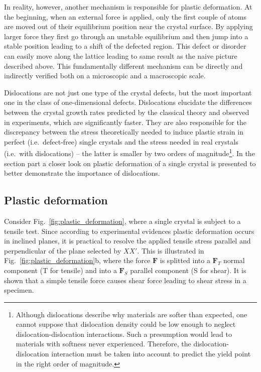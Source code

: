 In reality, however, another mechanism is responsible for plastic deformation. At the beginning, when an external force is applied, only the first couple of atoms are moved out of their equilibrium position near the crystal surface. By applying larger force they first go through an unstable equilibrium and then jump into a stable position leading to a shift of the defected region. This defect or disorder can easily move along the lattice leading to same result as the naive picture described above. This fundamentally different mechanism can be directly and indirectly verified both on a microscopic and a macroscopic scale.

Dislocations are not just one type of the crystal defects, but the most important one in the class of one-dimensional defects. Dislocations elucidate the differences between the crystal growth rates predicted by the classical theory and observed in experiments, which are significantly faster. They are also responsible for the discrepancy between the stress theoretically needed to induce plastic strain in perfect (i.e.\ defect-free) single crystals and the stress needed in real crystals (i.e.\ with dislocations) -- the latter is smaller by two orders of magnitude\footnote{Although dislocations describe why materials are softer than expected, one cannot suppose that dislocation density could be low enough to neglect dislocation-dislocation interactions. Such a presumption would lead to materials with softness never experienced. Therefore, the dislocation-dislocation interaction must be taken into account to predict the yield point in the right order of magnitude.}. In the section part a closer look on plastic deformation of a single crystal is presented to better demonstrate the importance of dislocations.

\subsection{Plastic deformation}

Consider Fig.~\ref{fig:plastic_deformation}, where a single crystal is subject to a tensile test. Since according to experimental evidences plastic deformation occurs in inclined planes, it is practical to resolve the applied tensile stress parallel and perpendicular of the plane selected by $XX'$. This is illustrated in Fig.~\ref{fig:plastic_deformation}b, where the force ${\mathbf{F}}$ is splitted into a ${{\mathbf{F}}_T}$ normal component (T for tensile) and into a ${{\mathbf{F}}_S}$ parallel component (S for shear). It is shown that a simple tensile force causes shear force leading to shear stress in a specimen.

